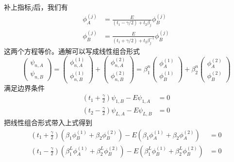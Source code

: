 \documentclass{article}
\begin{document}
补上指标$j$后，我们有
\begin{equation}
    \begin{split}
        \phi_A^{(j)}&=\frac{E}{(t_1-\gamma/2)+t_2\beta_j}\phi_B^{(j)}\\
        \phi_B^{(j)}&=\frac{E}{(t_1+\gamma/2)+t_2\beta_j^{-1}}\phi_B^{(j)}
    \end{split}
\end{equation}
这两个方程等价。通解可以写成线性组合形式
\begin{equation}
    \begin{pmatrix}
        \psi_{n,A}\\
        \psi_{n,B}
    \end{pmatrix}=\begin{pmatrix}
        \phi_{n,A}^{(1)}\\
        \phi_{n,B}^{(1)}
    \end{pmatrix}+\begin{pmatrix}
        \phi_{n,A}^{(2)}\\
        \phi_{n,B}^{(2)}
    \end{pmatrix}=\beta^{n}_1\begin{pmatrix}
        \phi_{A}^{(1)}\\
        \phi_{B}^{(1)}
    \end{pmatrix}+\beta_2^{n}\begin{pmatrix}
        \phi_{A}^{(2)}\\
        \phi_{B}^{(2)}
    \end{pmatrix}
\end{equation}
满足边界条件
\begin{equation}
    \begin{split}
        \left(t_1+\frac{\gamma}{2}\right)\psi_{1,B}-E\psi_{1,A}&=0\\
        \left(t_2-\frac{\gamma}{2}\right)\psi_{L,A}-E\psi_{L,B}&=0
    \end{split}
\end{equation}
把线性组合形式带入上式得到
\begin{equation}
    \begin{split}
        \left(t_1+\frac{\gamma}{2}\right)(\beta_1\phi_B^{(1)}+\beta_2\phi_B^{(2)})-E\left(\beta_1\phi_A^{(1)}+\beta_2\phi_A^{(2)}\right)&=0\\
        \left(t_1-\frac{\gamma}{2}\right)(\beta_1^L\phi_A^{(1)}+\beta_2^L\phi_B^{(2)})-E\left(\beta_1^L\phi_B^{(1)}+\beta_2^L\phi_B^{(2)}\right)&=0
    \end{split}
\end{equation}
\end{document}

